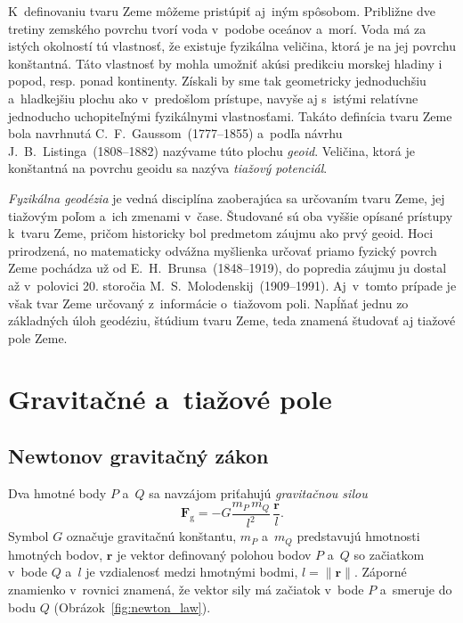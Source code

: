 \documentclass[a4paper,12pt]{book}
\newcommand{\gidx}{\mathrm g}
\let\vec\mathbf
\begin{document}
K~definovaniu tvaru Zeme môžeme pristúpiť aj~iným spôsobom.  Približne dve
tretiny zemského povrchu tvorí voda v~podobe oceánov a~morí.  Voda má za istých
okolností tú vlastnosť, že existuje fyzikálna veličina, ktorá je na jej povrchu
konštantná.  Táto vlastnosť by mohla umožniť akúsi predikciu morskej
hladiny i popod, resp. ponad kontinenty.  Získali by sme tak geometricky
jednoduchšiu a~hladkejšiu plochu ako v~predošlom prístupe, navyše aj
s~istými relatívne jednoducho uchopiteľnými fyzikálnymi vlastnosťami.  Takáto
definícia tvaru Zeme bola navrhnutá C.~F.~Gaussom~(1777--1855) a~podľa návrhu
J.~B.~Listinga~(1808--1882) nazývame túto plochu \emph{geoid}.  Veličina, ktorá
je konštantná na povrchu geoidu sa nazýva \emph{tiažový potenciál}.

\emph{Fyzikálna geodézia} je vedná disciplína zaoberajúca sa určovaním tvaru
Zeme, jej tiažovým poľom a~ich zmenami v~čase.  Študované sú oba vyššie opísané
prístupy k~tvaru Zeme, pričom historicky bol predmetom záujmu ako prvý geoid.
Hoci prirodzená, no matematicky odvážna myšlienka určovať priamo fyzický povrch
Zeme pochádza už od E.~H.~Brunsa~(1848--1919), do popredia záujmu ju dostal až
v~polovici 20. storočia M.~S.~Molodenskij~(1909--1991).  Aj~v~tomto prípade je
však tvar Zeme určovaný z~informácie o~tiažovom poli.  Napĺňať jednu zo 
základných úloh geodéziu, štúdium tvaru Zeme, teda znamená študovať aj tiažové
pole Zeme.







\chapter{Gravitačné a~tiažové pole}
\label{sec:gravitational_and_gravity_field}






\section{Newtonov gravitačný zákon}
\label{sec:newton_law}

Dva hmotné body $P$ a~$Q$ sa navzájom priťahujú \emph{gravitačnou silou}
%
\begin{equation}
\label{eq:newton_law}
\vec F_\gidx = -G \frac{m_P \, m_Q}{l^2} \, \frac{\vec r}{l}{.}
\end{equation}
%
Symbol $G$ označuje gravitačnú konštantu, $m_P$ a~$m_Q$ predstavujú hmotnosti 
hmotných bodov, $\vec r$ je vektor definovaný polohou bodov $P$ a~$Q$ so 
začiatkom v~bode $Q$ a~$l$ je vzdialenosť medzi hmotnými bodmi, $l = \| \vec 
r \|$.  Záporné znamienko v~rovnici znamená, že vektor sily má začiatok v~bode 
$P$ a~smeruje do bodu $Q$ (Obrázok~\ref{fig:newton_law}).
\end{document}
